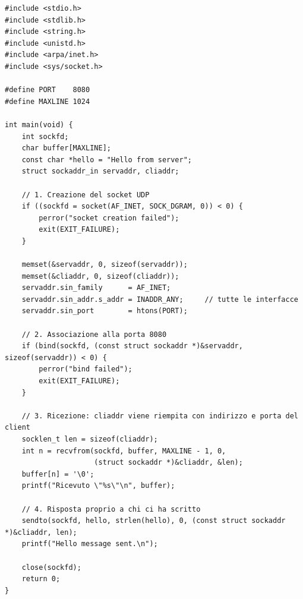 \begin{lstlisting}[language={[POSIX]C}, style=wnumbers, title={udp\_server.c}]
#include <stdio.h>
#include <stdlib.h>
#include <string.h>
#include <unistd.h>
#include <arpa/inet.h>
#include <sys/socket.h>

#define PORT    8080
#define MAXLINE 1024

int main(void) {
    int sockfd;
    char buffer[MAXLINE];
    const char *hello = "Hello from server";
    struct sockaddr_in servaddr, cliaddr;

    // 1. Creazione del socket UDP
    if ((sockfd = socket(AF_INET, SOCK_DGRAM, 0)) < 0) {
        perror("socket creation failed");
        exit(EXIT_FAILURE);
    }

    memset(&servaddr, 0, sizeof(servaddr));
    memset(&cliaddr, 0, sizeof(cliaddr));
    servaddr.sin_family      = AF_INET;
    servaddr.sin_addr.s_addr = INADDR_ANY;     // tutte le interfacce
    servaddr.sin_port        = htons(PORT);

    // 2. Associazione alla porta 8080
    if (bind(sockfd, (const struct sockaddr *)&servaddr, sizeof(servaddr)) < 0) {
        perror("bind failed");
        exit(EXIT_FAILURE);
    }

    // 3. Ricezione: cliaddr viene riempita con indirizzo e porta del client
    socklen_t len = sizeof(cliaddr);
    int n = recvfrom(sockfd, buffer, MAXLINE - 1, 0,
                     (struct sockaddr *)&cliaddr, &len);
    buffer[n] = '\0';
    printf("Ricevuto \"%s\"\n", buffer);

    // 4. Risposta proprio a chi ci ha scritto
    sendto(sockfd, hello, strlen(hello), 0, (const struct sockaddr *)&cliaddr, len);
    printf("Hello message sent.\n");

    close(sockfd);
    return 0;
}
\end{lstlisting}

